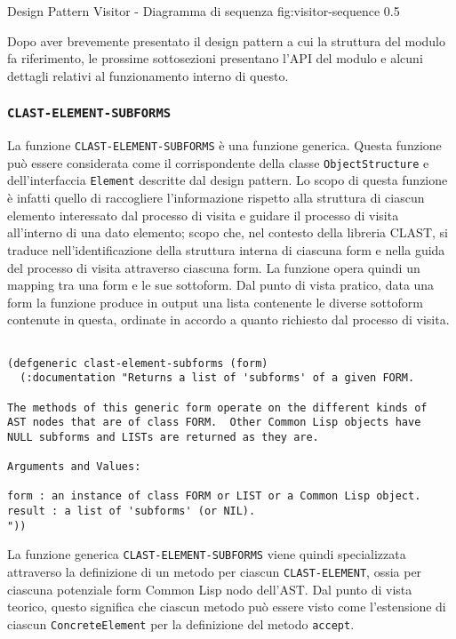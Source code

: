       {Design Pattern Visitor - Diagramma di sequenza}
      {fig:visitor-sequence}
      {0.5}

Dopo aver brevemente presentato il design pattern a cui la struttura del modulo
fa riferimento, le prossime sottosezioni presentano l'API del modulo e alcuni
dettagli relativi al funzionamento interno di questo.

\subsubsection{\texttt{CLAST-ELEMENT-SUBFORMS}}

La funzione \texttt{CLAST-ELEMENT-SUBFORMS} è una funzione generica. Questa
funzione può essere considerata come il corrispondente della classe
\texttt{ObjectStructure} e dell'interfaccia \texttt{Element} descritte dal
design pattern. Lo scopo di questa funzione è infatti quello di raccogliere
l'informazione rispetto alla struttura di ciascun elemento interessato dal
processo di visita e guidare il processo di visita all'interno di una dato
elemento; scopo che, nel contesto della libreria CLAST, si traduce
nell'identificazione della struttura interna di ciascuna form e nella guida del
processo di visita attraverso ciascuna form. La funzione opera quindi un mapping
tra una form e le sue sottoform. Dal punto di vista pratico, data una form la
funzione produce in output una lista contenente le diverse sottoform contenute
in questa, ordinate in accordo a quanto richiesto dal processo di visita.

\begin{lstlisting}[caption=Definizione della funzione \texttt
{CLAST-ELEMENT-SUBFORMS}]

(defgeneric clast-element-subforms (form)
  (:documentation "Returns a list of 'subforms' of a given FORM.

The methods of this generic form operate on the different kinds of
AST nodes that are of class FORM.  Other Common Lisp objects have
NULL subforms and LISTs are returned as they are.

Arguments and Values:

form : an instance of class FORM or LIST or a Common Lisp object.
result : a list of 'subforms' (or NIL).
"))

\end{lstlisting}

La funzione generica \texttt{CLAST-ELEMENT-SUBFORMS} viene quindi specializzata
attraverso la definizione di un metodo per ciascun \texttt{CLAST-ELEMENT}, ossia
per ciascuna potenziale form Common Lisp nodo dell'AST. Dal punto di vista
teorico, questo significa che ciascun metodo può essere visto come l'estensione
di ciascun \texttt{ConcreteElement} per la definizione del metodo
\texttt{accept}.\\

